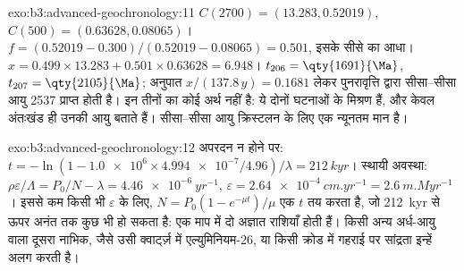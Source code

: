 \begin{solution}{exo:b3:advanced-geochronology:11}
$C(2700) = (13.283, 0.52019)$, $C(500) = (0.63628, 0.08065)$। $f = (0.52019 -
0.300)/(0.52019 - 0.08065) = 0.501$, इसके सीसे का आधा। $x = 0.499\times13.283 +
0.501\times0.63628 = 6.948$। $t_{206} = \qty{1691}{\Ma}$, $t_{207} =
\qty{2105}{\Ma}$; अनुपात $x/(137.8\,y) = 0.1681$ लेकर पुनरावृत्ति द्वारा
सीसा--सीसा आयु \qty{2537}{\Ma} प्राप्त होती है। इन तीनों का कोई अर्थ नहीं है: ये
दोनों घटनाओं के मिश्रण हैं, और केवल अंतःखंड ही उनकी आयु बताते हैं। सीसा--सीसा
आयु क्रिस्टलन के लिए एक न्यूनतम मान है।
\end{solution}

\begin{solution}{exo:b3:advanced-geochronology:12}
अपरदन न होने पर: $t = -\ln(1 - \num{1.0e6}\times\num{4.994e-7}/4.96)/\lambda =
\qty{212}{kyr}$। स्थायी अवस्था: $\rho\varepsilon/\Lambda = P_0/N - \lambda =
\qty{4.46e-6}{yr^{-1}}$, $\varepsilon = \qty{2.64e-4}{cm.yr^{-1}} =
\qty{2.6}{m.Myr^{-1}}$। इससे कम किसी भी $\varepsilon$ के लिए, $N =
P_0(1 - e^{-\mu t})/\mu$ एक $t$ तय करता है, जो \qty{212}{kyr} से
ऊपर अनंत तक कुछ भी हो सकता है: एक माप में दो अज्ञात राशियाँ होती हैं। किसी अन्य
अर्ध-आयु वाला दूसरा नाभिक, जैसे उसी क्वार्ट्ज़ में एल्युमिनियम-26, या
किसी क्रोड में गहराई पर सांद्रता इन्हें अलग करती है।
\end{solution}

